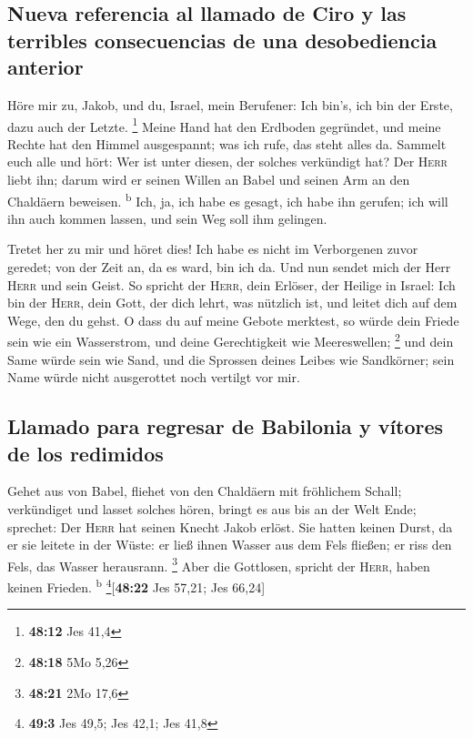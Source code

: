 \hypertarget{nueva-referencia-al-llamado-de-ciro-y-las-terribles-consecuencias-de-una-desobediencia-anterior}{%
\subsection{Nueva referencia al llamado de Ciro y las terribles
consecuencias de una desobediencia
anterior}\label{nueva-referencia-al-llamado-de-ciro-y-las-terribles-consecuencias-de-una-desobediencia-anterior}}

 Höre mir zu, Jakob, und du, Israel, mein Berufener: Ich
bin's, ich bin der Erste, dazu auch der Letzte. \footnote{\textbf{48:12}
  Jes 41,4}  Meine Hand hat den Erdboden gegründet, und
meine Rechte hat den Himmel ausgespannt; was ich rufe, das steht alles
da.  Sammelt euch alle und hört: Wer ist unter diesen,
der solches verkündigt hat? Der \textsc{Herr} liebt ihn; darum wird er
seinen Willen an Babel und seinen Arm an den Chaldäern beweisen.
\textsuperscript{b}  Ich, ja, ich habe es gesagt, ich
habe ihn gerufen; ich will ihn auch kommen lassen, und sein Weg soll ihm
gelingen.

 Tretet her zu mir und höret dies! Ich habe es nicht im
Verborgenen zuvor geredet; von der Zeit an, da es ward, bin ich da. Und
nun sendet mich der Herr \textsc{Herr} und sein Geist. 
So spricht der \textsc{Herr}, dein Erlöser, der Heilige in Israel: Ich
bin der \textsc{Herr}, dein Gott, der dich lehrt, was nützlich ist, und
leitet dich auf dem Wege, den du gehst.  O dass du auf
meine Gebote merktest, so würde dein Friede sein wie ein Wasserstrom,
und deine Gerechtigkeit wie Meereswellen; \footnote{\textbf{48:18} 5Mo
  5,26}  und dein Same würde sein wie Sand, und die
Sprossen deines Leibes wie Sandkörner; sein Name würde nicht ausgerottet
noch vertilgt vor mir.

\hypertarget{llamado-para-regresar-de-babilonia-y-vuxedtores-de-los-redimidos}{%
\subsection{Llamado para regresar de Babilonia y vítores de los
redimidos}\label{llamado-para-regresar-de-babilonia-y-vuxedtores-de-los-redimidos}}

 Gehet aus von Babel, fliehet von den Chaldäern mit
fröhlichem Schall; verkündiget und lasset solches hören, bringt es aus
bis an der Welt Ende; sprechet: Der \textsc{Herr} hat seinen Knecht
Jakob erlöst.  Sie hatten keinen Durst, da er sie leitete
in der Wüste: er ließ ihnen Wasser aus dem Fels fließen; er riss den
Fels, das Wasser herausrann. \footnote{\textbf{48:21} 2Mo 17,6}
 Aber die Gottlosen, spricht der \textsc{Herr}, haben
keinen Frieden. \textsuperscript{b} \footnote{\textbf{49:3} Jes 49,5;
  Jes 42,1; Jes 41,8}{[}\textbf{48:22} Jes 57,21; Jes 66,24{]}


